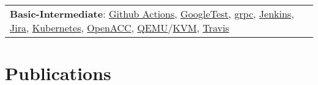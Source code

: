 \documentclass[a4paper,11pt]{article}
\begin{document}
\begin{tabularx}{\linewidth}{@{}l X@{}}
                       \textbf{Basic-Intermediate}:
                       \href{https://github.com/features/actions}{Github Actions},
                       \href{https://google.github.io/googletest/}{GoogleTest},
                       \href{https://grpc.io/}{grpc},
                       \href{https://www.jenkins.io/}{Jenkins},
                       \href{https://www.atlassian.com/es/software/jira}{Jira},
                       \href{https://kubernetes.io/}{Kubernetes},
                       \href{https://www.openacc.org/}{OpenACC},
                       \href{https://www.qemu.org/}{QEMU}/\href{https://www.linux-kvm.org/page/Main_Page}{KVM},
                       \href{https://www.travis-ci.com/}{Travis} \\
\end{tabularx}

\section{Publications}
\begin{refsection}
    \nocite{*}
    \printbibliography[heading=none]
\end{refsection}


\vfill
{}
\end{document}
